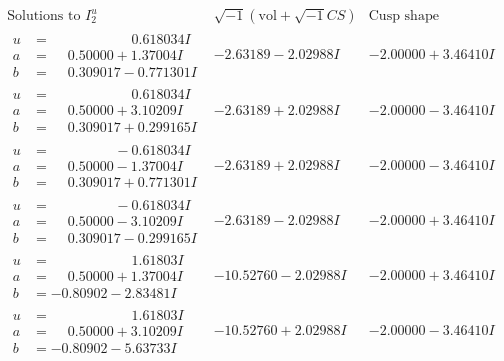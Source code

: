 \documentclass[1p]{elsarticle_modified}
\theoremstyle{definition}
\newcommand{\I}{\sqrt{-1}}
\begin{document}
$$\begin{array}{c|c|c}  
\text{Solutions to }I^u_{2}& \I (\text{vol} + \sqrt{-1}CS) & \text{Cusp shape}\\
 \hline 
\begin{aligned}
u &= \phantom{-0.000000 -}0.618034 I \\
a &= \phantom{-}0.50000 + 1.37004 I \\
b &= \phantom{-}0.309017 - 0.771301 I\end{aligned}
 & -2.63189 - 2.02988 I & -2.00000 + 3.46410 I \\ \hline\begin{aligned}
u &= \phantom{-0.000000 -}0.618034 I \\
a &= \phantom{-}0.50000 + 3.10209 I \\
b &= \phantom{-}0.309017 + 0.299165 I\end{aligned}
 & -2.63189 + 2.02988 I & -2.00000 - 3.46410 I \\ \hline\begin{aligned}
u &= \phantom{-0.000000 } -0.618034 I \\
a &= \phantom{-}0.50000 - 1.37004 I \\
b &= \phantom{-}0.309017 + 0.771301 I\end{aligned}
 & -2.63189 + 2.02988 I & -2.00000 - 3.46410 I \\ \hline\begin{aligned}
u &= \phantom{-0.000000 } -0.618034 I \\
a &= \phantom{-}0.50000 - 3.10209 I \\
b &= \phantom{-}0.309017 - 0.299165 I\end{aligned}
 & -2.63189 - 2.02988 I & -2.00000 + 3.46410 I \\ \hline\begin{aligned}
u &= \phantom{-0.000000 -}1.61803 I \\
a &= \phantom{-}0.50000 + 1.37004 I \\
b &= -0.80902 - 2.83481 I\end{aligned}
 & -10.52760 - 2.02988 I & -2.00000 + 3.46410 I \\ \hline\begin{aligned}
u &= \phantom{-0.000000 -}1.61803 I \\
a &= \phantom{-}0.50000 + 3.10209 I \\
b &= -0.80902 - 5.63733 I\end{aligned}
 & -10.52760 + 2.02988 I & -2.00000 - 3.46410 I \\ \hline\begin{aligned}

\end{aligned}
\end{array}$$
\end{document}
